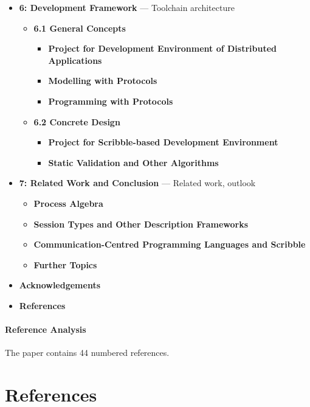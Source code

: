 \documentclass{article}
\begin{document}
\begin{itemize}
    \item \textbf{6: Development Framework} --- Toolchain architecture
    \begin{itemize}
        \item \textbf{6.1 General Concepts}
        \begin{itemize}
            \item \textbf{Project for Development Environment of Distributed Applications}
            \item \textbf{Modelling with Protocols}
            \item \textbf{Programming with Protocols}
        \end{itemize}

        \item \textbf{6.2 Concrete Design}
        \begin{itemize}
            \item \textbf{Project for Scribble-based Development Environment}
            \item \textbf{Static Validation and Other Algorithms}
        \end{itemize}
    \end{itemize}

    \item \textbf{7: Related Work and Conclusion} --- Related work, outlook
    \begin{itemize}
        \item \textbf{Process Algebra}
        \item \textbf{Session Types and Other Description Frameworks}
        \item \textbf{Communication-Centred Programming Languages and Scribble}
        \item \textbf{Further Topics}
    \end{itemize}

    \item \textbf{Acknowledgements}

    \item \textbf{References}
\end{itemize}

\paragraph{Reference Analysis}
The paper contains 44 numbered references.


\section{References}



\end{document}
